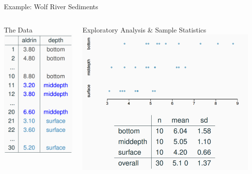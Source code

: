 \documentclass[
  ignorenonframetext,
]{beamer}
\begin{document}
\begin{frame}{Example: Wolf River Sediments}
\begin{columns}[T]
\begin{frame}{The Data}
\label{the-data}
\includegraphics{class30_files/mediabag/concentration-table.png}
\end{frame}

\begin{frame}{Exploratory Analysis \& Sample Statistics}
\label{exploratory-analysis-sample-statistics}
\includegraphics{class30_files/mediabag/summary-statistics.png}
\end{frame}


\end{columns}
\end{frame}
\end{document}
